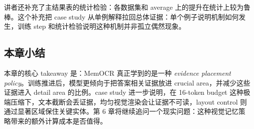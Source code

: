 讲者还补充了主结果表的统计检验：各数据集和 average 上的提升在统计上较为鲁棒。这个补充把 case study 从单例解释拉回总体证据：单个例子说明机制如何发生，训练 step 和统计检验说明这种机制并非孤立偶然现象。

\subsection{本章小结}

本章的核心 takeaway 是：MemOCR 真正学到的是一种 \textit{evidence placement policy}。训练推进后，模型更倾向于把答案相关证据放进 crucial area，并减少这些证据进入 detail area 的比例。case study 进一步说明，在 16-token budget 这种极端压缩下，文本截断会丢证据，均匀视觉渲染会让证据不可读，layout control 则通过显著区域保住关键实体。第 6 章将继续追问一个现实问题：这种视觉记忆策略带来的额外计算成本是否值得。
